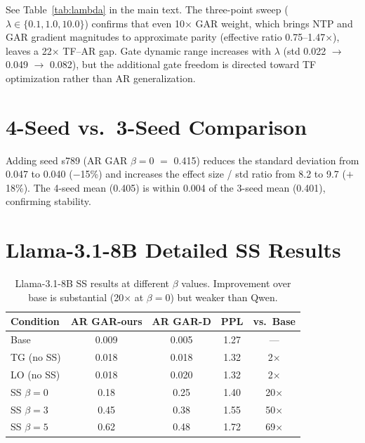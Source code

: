 \documentclass[11pt,a4paper]{article}
\begin{document}
See Table~\ref{tab:lambda} in the main text. The three-point sweep ($\lambda \in \{0.1, 1.0, 10.0\}$) confirms that even 10$\times$ GAR weight, which brings NTP and GAR gradient magnitudes to approximate parity (effective ratio 0.75--1.47$\times$), leaves a 22$\times$ TF--AR gap. Gate dynamic range increases with $\lambda$ (std 0.022 $\to$ 0.049 $\to$ 0.082), but the additional gate freedom is directed toward TF optimization rather than AR generalization.

\section{4-Seed vs.\ 3-Seed Comparison}

Adding seed s789 (AR GAR $\beta{=}0$ $=$ 0.415) reduces the standard deviation from 0.047 to 0.040 ($-$15\%) and increases the effect size / std ratio from 8.2 to 9.7 ($+$18\%). The 4-seed mean (0.405) is within 0.004 of the 3-seed mean (0.401), confirming stability.

\section{Llama-3.1-8B Detailed SS Results}

\begin{table}[h]
\centering
\small
\caption{Llama-3.1-8B SS results at different $\beta$ values. Improvement over base is substantial (20$\times$ at $\beta{=}0$) but weaker than Qwen.}
\begin{tabular}{@{}lcccc@{}}
\toprule
Condition & AR GAR-ours & AR GAR-D & PPL & vs.\ Base \\
\midrule
Base & 0.009 & 0.005 & 1.27 & --- \\
TG (no SS) & 0.018 & 0.018 & 1.32 & 2$\times$ \\
LO (no SS) & 0.018 & 0.020 & 1.32 & 2$\times$ \\
SS $\beta{=}0$ & 0.18 & 0.25 & 1.40 & 20$\times$ \\
SS $\beta{=}3$ & 0.45 & 0.38 & 1.55 & 50$\times$ \\
SS $\beta{=}5$ & 0.62 & 0.48 & 1.72 & 69$\times$ \\
\bottomrule
\end{tabular}
\end{table}
\end{document}
